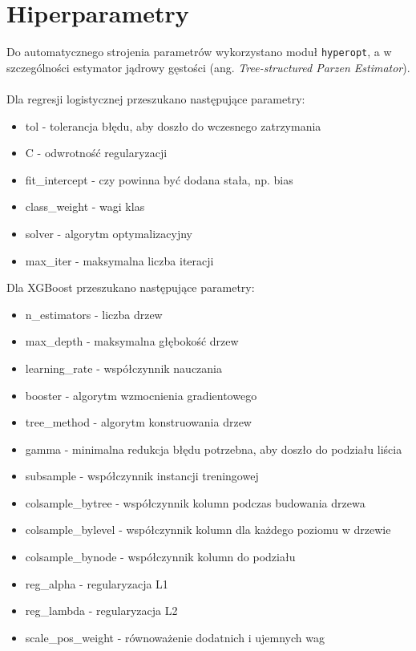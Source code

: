 \documentclass[12pt,a4paper]{article}
\begin{document}
\section*{Hiperparametry}
Do automatycznego strojenia parametrów wykorzystano moduł \texttt{hyperopt}, a w szczególności estymator jądrowy gęstości (ang. \textit{Tree-structured Parzen Estimator}).
\\
\\
Dla regresji logistycznej przeszukano następujące parametry:
\begin{itemize}
	\item tol - tolerancja błędu, aby doszło do wczesnego zatrzymania
	\item C - odwrotność regularyzacji
	\item fit\_intercept - czy powinna być dodana stała, np. bias
	\item class\_weight - wagi klas
	\item solver - algorytm optymalizacyjny
	\item max\_iter - maksymalna liczba iteracji
\end{itemize}
Dla XGBoost przeszukano następujące parametry:
\begin{itemize}
	\item n\_estimators - liczba drzew
	\item max\_depth - maksymalna głębokość drzew
	\item learning\_rate - współczynnik nauczania
	\item booster - algorytm wzmocnienia gradientowego
	\item tree\_method - algorytm konstruowania drzew
	\item gamma - minimalna redukcja błędu potrzebna, aby doszło do podziału liścia
	\item subsample - współczynnik instancji treningowej
	\item colsample\_bytree - współczynnik kolumn podczas budowania drzewa
	\item colsample\_bylevel - współczynnik kolumn dla każdego poziomu w drzewie
	\item colsample\_bynode - współczynnik kolumn do podziału
	\item reg\_alpha - regularyzacja L1
	\item reg\_lambda - regularyzacja L2
	\item scale\_pos\_weight - równoważenie dodatnich i ujemnych wag
\end{itemize}

\datatableA
\end{document}
